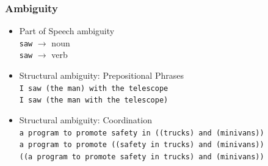 %

\begin{frame}
\frametitle{Ambiguity}
\begin{itemize}
  \item Part of Speech ambiguity\\
        {\tt saw} $\rightarrow$ {\color{red}noun}\\
        {\tt saw} $\rightarrow$ {\color{red}verb}
  \item Structural ambiguity: Prepositional Phrases\\
        {\tt I saw (the man) with the telescope}\\
        {\tt I saw (the man with the telescope)}
  \item Structural ambiguity: Coordination\\
        {\tt a program to promote safety in ((trucks) and (minivans))}\\
        {\tt a program to promote ((safety in trucks) and (minivans))}\\
        {\tt ((a program to promote safety in trucks) and (minivans))}
\end{itemize}

\end{frame}

